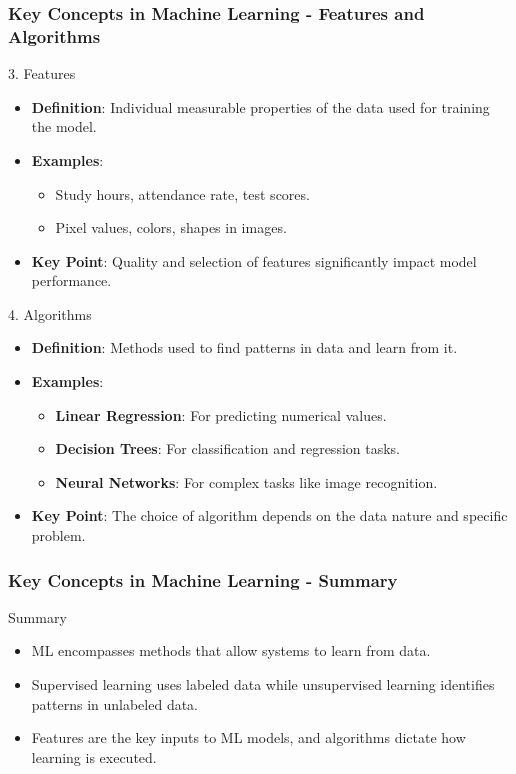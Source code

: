 \documentclass[aspectratio=169]{beamer}
\begin{document}
\begin{frame}[fragile]
    \frametitle{Key Concepts in Machine Learning - Features and Algorithms}
    \begin{block}{3. Features}
        \begin{itemize}
            \item \textbf{Definition}: Individual measurable properties of the data used for training the model.
            \item \textbf{Examples}: 
            \begin{itemize}
                \item Study hours, attendance rate, test scores.
                \item Pixel values, colors, shapes in images.
            \end{itemize}
            \item \textbf{Key Point}: Quality and selection of features significantly impact model performance.
        \end{itemize}
    \end{block}
    
    \begin{block}{4. Algorithms}
        \begin{itemize}
            \item \textbf{Definition}: Methods used to find patterns in data and learn from it.
            \item \textbf{Examples}: 
            \begin{itemize}
                \item \textbf{Linear Regression}: For predicting numerical values.
                \item \textbf{Decision Trees}: For classification and regression tasks.
                \item \textbf{Neural Networks}: For complex tasks like image recognition.
            \end{itemize}
            \item \textbf{Key Point}: The choice of algorithm depends on the data nature and specific problem.
        \end{itemize}
    \end{block}
\end{frame}

\begin{frame}[fragile]
    \frametitle{Key Concepts in Machine Learning - Summary}
    \begin{block}{Summary}
        \begin{itemize}
            \item ML encompasses methods that allow systems to learn from data.
            \item Supervised learning uses labeled data while unsupervised learning identifies patterns in unlabeled data.
            \item Features are the key inputs to ML models, and algorithms dictate how learning is executed.
        \end{itemize}
    \end{block}
\end{frame}
\end{document}

